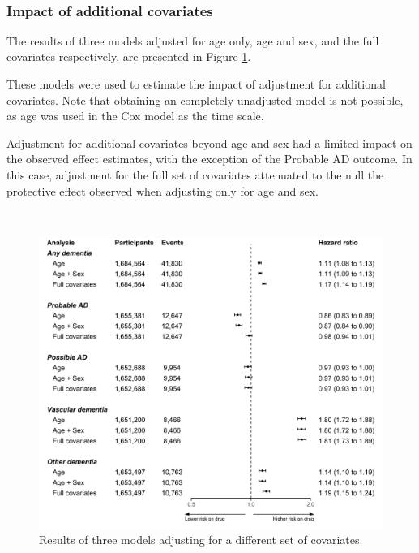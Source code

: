 \documentclass[a4paper, twoside]{templates/ociamthesis}
\begin{document}
~

\hypertarget{impact-of-additional-covariates-1}{%
\subsubsection{Impact of additional covariates}\label{impact-of-additional-covariates-1}}

The results of three models adjusted for age only, age and sex, and the full covariates respectively, are presented in Figure \ref{fig:unadjustedComparisonFig}.

These models were used to estimate the impact of adjustment for additional covariates. Note that obtaining an completely unadjusted model is not possible, as age was used in the Cox model as the time scale.

Adjustment for additional covariates beyond age and sex had a limited impact on the observed effect estimates, with the exception of the Probable AD outcome. In this case, adjustment for the full set of covariates attenuated to the null the protective effect observed when adjusting only for age and sex.

~





\begin{figure}[H]
\includegraphics[width=1\linewidth]{figures/cprd-analysis/forester_unadjusted} \caption[Comparison of different combinations of covariates]{Results of three models adjusting for a different set of covariates.}\label{fig:unadjustedComparisonFig}
\end{figure}
\end{document}
